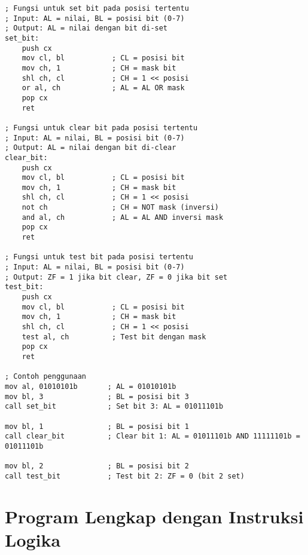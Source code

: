 \documentclass[../main.tex]{subfiles}
\begin{document}
\begin{lstlisting}[language={[x86masm]Assembler}, caption=Set/Clear Bit dan Bit Testing, label={lst:bit-operations}]
; Fungsi untuk set bit pada posisi tertentu
; Input: AL = nilai, BL = posisi bit (0-7)
; Output: AL = nilai dengan bit di-set
set_bit:
    push cx
    mov cl, bl           ; CL = posisi bit
    mov ch, 1            ; CH = mask bit
    shl ch, cl           ; CH = 1 << posisi
    or al, ch            ; AL = AL OR mask
    pop cx
    ret

; Fungsi untuk clear bit pada posisi tertentu
; Input: AL = nilai, BL = posisi bit (0-7)
; Output: AL = nilai dengan bit di-clear
clear_bit:
    push cx
    mov cl, bl           ; CL = posisi bit
    mov ch, 1            ; CH = mask bit
    shl ch, cl           ; CH = 1 << posisi
    not ch               ; CH = NOT mask (inversi)
    and al, ch           ; AL = AL AND inversi mask
    pop cx
    ret

; Fungsi untuk test bit pada posisi tertentu
; Input: AL = nilai, BL = posisi bit (0-7)
; Output: ZF = 1 jika bit clear, ZF = 0 jika bit set
test_bit:
    push cx
    mov cl, bl           ; CL = posisi bit
    mov ch, 1            ; CH = mask bit
    shl ch, cl           ; CH = 1 << posisi
    test al, ch          ; Test bit dengan mask
    pop cx
    ret

; Contoh penggunaan
mov al, 01010101b       ; AL = 01010101b
mov bl, 3               ; BL = posisi bit 3
call set_bit            ; Set bit 3: AL = 01011101b

mov bl, 1               ; BL = posisi bit 1
call clear_bit          ; Clear bit 1: AL = 01011101b AND 11111101b = 01011101b

mov bl, 2               ; BL = posisi bit 2
call test_bit           ; Test bit 2: ZF = 0 (bit 2 set)
\end{lstlisting}

\section{Program Lengkap dengan Instruksi Logika}
\end{document}
